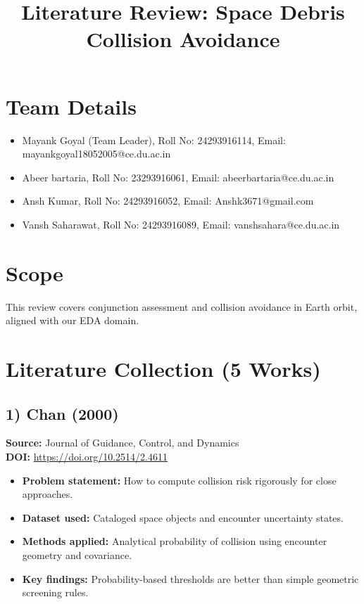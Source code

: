 \documentclass[11pt]{article}
\title{Literature Review: Space Debris Collision Avoidance}
\author{}
\date{}
\begin{document}
\maketitle

\section*{Team Details}
\begin{itemize}[noitemsep]
    \item Mayank Goyal (Team Leader), Roll No: 24293916114, Email: mayankgoyal18052005@ce.du.ac.in
    \item Abeer bartaria, Roll No: 23293916061, Email: abeerbartaria@ce.du.ac.in
    \item Ansh Kumar, Roll No: 24293916052, Email: Anshk3671@gmail.com
    \item Vansh Saharawat, Roll No: 24293916089, Email: vanshsahara@ce.du.ac.in
\end{itemize}

\section*{Scope}
This review covers conjunction assessment and collision avoidance in Earth orbit, aligned with our EDA domain.

\section*{Literature Collection (5 Works)}

\subsection*{1) Chan (2000)}
\textbf{Source:} Journal of Guidance, Control, and Dynamics \\
\textbf{DOI:} \url{https://doi.org/10.2514/2.4611}
\begin{itemize}[noitemsep]
    \item \textbf{Problem statement:} How to compute collision risk rigorously for close approaches.
    \item \textbf{Dataset used:} Cataloged space objects and encounter uncertainty states.
    \item \textbf{Methods applied:} Analytical probability of collision using encounter geometry and covariance.
    \item \textbf{Key findings:} Probability-based thresholds are better than simple geometric screening rules.
\end{itemize}
\end{document}
